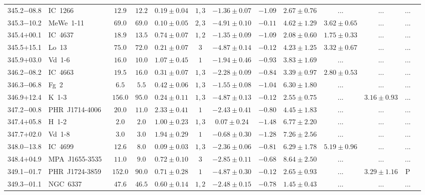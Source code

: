 \documentclass[useAMS]{mn2e}
\begin{document}
\begin{center}
{\begin{longtable}{llccccccccccc}
345.2$-$08.8&IC~1266&$      12.9$&$      12.2$&$0.19 \pm 0.04$&$1,3$&$-1.36 \pm 0.07$&$     -1.09$&$2.67 \pm 0.76$&$...$&$...$&...\\
345.3$-$10.2&MeWe~1-11&$      69.0$&$      69.0$&$0.10 \pm 0.05$&$2,3$&$-4.91 \pm 0.10$&$     -0.11$&$4.62 \pm 1.29$&$3.62 \pm 0.65$&$...$&...\\
345.4$+$00.1&IC~4637&$      18.9$&$      13.5$&$0.74 \pm 0.07$&$1,2$&$-1.35 \pm 0.09$&$     -1.09$&$2.08 \pm 0.60$&$1.75 \pm 0.33$&$...$&...\\
345.5$+$15.1&Lo~13&$      75.0$&$      72.0$&$0.21 \pm 0.07$&$3$&$-4.87 \pm 0.14$&$     -0.12$&$4.23 \pm 1.25$&$3.32 \pm 0.67$&$...$&...\\
345.9$+$03.0&Vd~1-6&$      16.0$&$      10.0$&$1.07 \pm 0.45$&$1$&$-1.94 \pm 0.46$&$     -0.93$&$3.83 \pm 1.69$&$...$&$...$&...\\
346.2$-$08.2&IC~4663&$      19.5$&$      16.0$&$0.31 \pm 0.07$&$1,3$&$-2.28 \pm 0.09$&$     -0.84$&$3.39 \pm 0.97$&$2.80 \pm 0.53$&$...$&...\\
346.3$-$06.8&Fg~2&$       6.5$&$       5.5$&$0.42 \pm 0.06$&$1,3$&$-1.55 \pm 0.08$&$     -1.04$&$6.30 \pm 1.80$&$...$&$...$&...\\
346.9$+$12.4&K~1-3&$     156.0$&$      95.0$&$0.24 \pm 0.11$&$1,3$&$-4.87 \pm 0.13$&$     -0.12$&$2.55 \pm 0.75$&$...$&$3.16 \pm 0.93$&...\\
347.2$-$00.8&PHR~J1714-4006&$      20.0$&$      11.0$&$2.33 \pm 0.41$&$1$&$-2.43 \pm 0.41$&$     -0.80$&$4.45 \pm 1.83$&$...$&$...$&...\\
347.4$+$05.8&H~1-2&$       2.0$&$       2.0$&$1.00 \pm 0.23$&$1,3$&$0.07 \pm 0.24$&$     -1.48$&$6.77 \pm 2.20$&$...$&$...$&...\\
347.7$+$02.0&Vd~1-8&$       3.0$&$       3.0$&$1.94 \pm 0.29$&$1$&$-0.68 \pm 0.30$&$     -1.28$&$7.26 \pm 2.56$&$...$&$...$&...\\
348.0$-$13.8&IC~4699&$      12.6$&$       8.0$&$0.09 \pm 0.03$&$1,3$&$-2.36 \pm 0.06$&$     -0.81$&$6.29 \pm 1.78$&$5.19 \pm 0.96$&$...$&...\\
348.4$+$04.9&MPA~J1655-3535~&$      11.0$&$       9.0$&$0.72 \pm 0.10$&$3$&$-2.85 \pm 0.11$&$     -0.68$&$8.64 \pm 2.50$&$...$&$...$&...\\
349.1$-$01.7&PHR~J1724-3859&$     152.0$&$      90.0$&$0.71 \pm 0.28$&$1$&$-4.87 \pm 0.30$&$     -0.12$&$2.65 \pm 0.93$&$...$&$3.29 \pm 1.16$&P\\
349.3$-$01.1&NGC~6337&$      47.6$&$      46.5$&$0.60 \pm 0.14$&$1,2$&$-2.48 \pm 0.15$&$     -0.78$&$1.45 \pm 0.43$&$...$&$...$&...\\

\end{longtable}}
\end{center}
\end{document}
